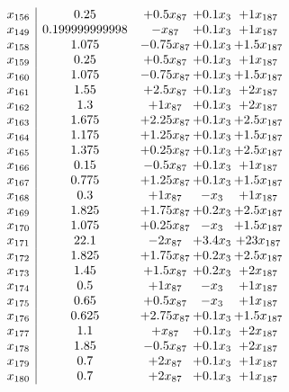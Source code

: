 \documentclass[11pt]{article}
\begin{document}
\[\begin{array}{c| c c@{\hskip 2pt} c@{\hskip 2pt} c@{\hskip 2pt} }
 x_{156}   &  0.25 & + 0.5 x_{87} & + 0.1 x_{3} & + 1 x_{187}\\
 x_{149}   &  0.199999999998 & - x_{87} & + 0.1 x_{3} & + 1 x_{187}\\
 x_{158}   &  1.075 & -0.75 x_{87} & + 0.1 x_{3} & + 1.5 x_{187}\\
 x_{159}   &  0.25 & + 0.5 x_{87} & + 0.1 x_{3} & + 1 x_{187}\\
 x_{160}   &  1.075 & -0.75 x_{87} & + 0.1 x_{3} & + 1.5 x_{187}\\
 x_{161}   &  1.55 & + 2.5 x_{87} & + 0.1 x_{3} & + 2 x_{187}\\
 x_{162}   &  1.3 & + 1 x_{87} & + 0.1 x_{3} & + 2 x_{187}\\
 x_{163}   &  1.675 & + 2.25 x_{87} & + 0.1 x_{3} & + 2.5 x_{187}\\
 x_{164}   &  1.175 & + 1.25 x_{87} & + 0.1 x_{3} & + 1.5 x_{187}\\
 x_{165}   &  1.375 & + 0.25 x_{87} & + 0.1 x_{3} & + 2.5 x_{187}\\
 x_{166}   &  0.15 & -0.5 x_{87} & + 0.1 x_{3} & + 1 x_{187}\\
 x_{167}   &  0.775 & + 1.25 x_{87} & + 0.1 x_{3} & + 1.5 x_{187}\\
 x_{168}   &  0.3 & + 1 x_{87} & - x_{3} & + 1 x_{187}\\
 x_{169}   &  1.825 & + 1.75 x_{87} & + 0.2 x_{3} & + 2.5 x_{187}\\
 x_{170}   &  1.075 & + 0.25 x_{87} & - x_{3} & + 1.5 x_{187}\\
 x_{171}   &  22.1 & -2 x_{87} & + 3.4 x_{3} & + 23 x_{187}\\
 x_{172}   &  1.825 & + 1.75 x_{87} & + 0.2 x_{3} & + 2.5 x_{187}\\
 x_{173}   &  1.45 & + 1.5 x_{87} & + 0.2 x_{3} & + 2 x_{187}\\
 x_{174}   &  0.5 & + 1 x_{87} & - x_{3} & + 1 x_{187}\\
 x_{175}   &  0.65 & + 0.5 x_{87} & - x_{3} & + 1 x_{187}\\
 x_{176}   &  0.625 & + 2.75 x_{87} & + 0.1 x_{3} & + 1.5 x_{187}\\
 x_{177}   &  1.1 & +  x_{87} & + 0.1 x_{3} & + 2 x_{187}\\
 x_{178}   &  1.85 & -0.5 x_{87} & + 0.1 x_{3} & + 2 x_{187}\\
 x_{179}   &  0.7 & + 2 x_{87} & + 0.1 x_{3} & + 1 x_{187}\\
 x_{180}   &  0.7 & + 2 x_{87} & + 0.1 x_{3} & + 1 x_{187}\\

\end{array}\]
\end{document}
